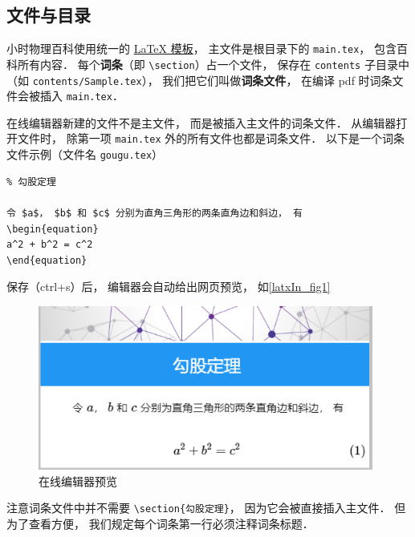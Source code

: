 

\subsection{文件与目录}

小时物理百科使用统一的 \href{https://github.com/MacroUniverse/PhysWiki}{LaTeX 模板}， 主文件是根目录下的 \lstinline|main.tex|， 包含百科所有内容． 每个\textbf{词条}（即 \lstinline|\section|）占一个文件， 保存在 \lstinline|contents| 子目录中 （如 \lstinline|contents/Sample.tex|）， 我们把它们叫做\textbf{词条文件}， 在编译 pdf 时词条文件会被插入 \lstinline|main.tex|．

在线编辑器新建的文件不是主文件， 而是被插入主文件的词条文件． 从编辑器打开文件时， 除第一项 \lstinline|main.tex| 外的所有文件也都是词条文件． 以下是一个词条文件示例（文件名 \lstinline|gougu.tex|）

\begin{lstlisting}
% 勾股定理

令 $a$， $b$ 和 $c$ 分别为直角三角形的两条直角边和斜边， 有
\begin{equation}
a^2 + b^2 = c^2
\end{equation}
\end{lstlisting}
保存（ctrl+s）后， 编辑器会自动给出网页预览， 如\autoref{latxIn_fig1}
\begin{figure}[ht]
\centering
\includegraphics[width=11cm]{./figures/editIn1.png}
\caption{在线编辑器预览} \label{editIn_fig1}
\end{figure}

注意词条文件中并不需要 \lstinline|\section{勾股定理}|， 因为它会被直接插入主文件． 但为了查看方便， 我们规定每个词条第一行必须注释词条标题．


